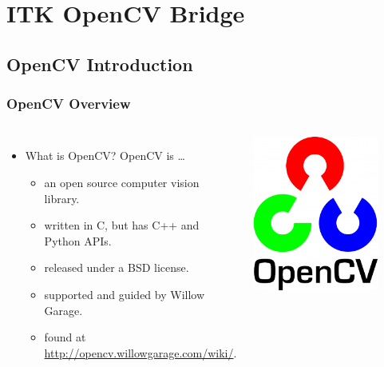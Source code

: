\section{ITK OpenCV Bridge}

\subsection{OpenCV Introduction}





\begin{frame}
\frametitle{OpenCV Overview}
\begin{center}
\begin{columns}[c]
\begin{itemize}
\item What is OpenCV?  OpenCV is \ldots
  \begin{itemize}
  \item an open source computer vision library.
  \item written in C, but has C++ and Python APIs.
  \item released under a BSD license.
  \item supported and guided by Willow Garage.
  \item found at \url{http://opencv.willowgarage.com/wiki/}.
  \end{itemize}
\end{itemize}
 \includegraphics[width=0.8\textwidth]{../Art/OpenCVLogo.png}

\end{columns}
\end{center}
\end{frame}

